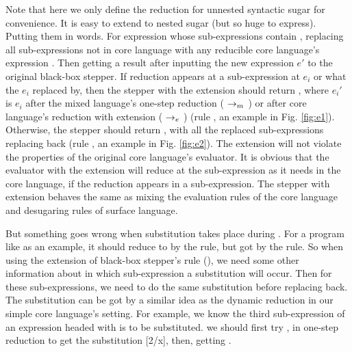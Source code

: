 Note that here we only define the reduction for unnested syntactic sugar for convenience. It is easy to extend to nested sugar (but so huge to express). Putting them in words. For expression  whose sub-expressions contain , replacing all  sub-expressions not in core language with any reducible core language's expression . Then getting a result after inputting the new expression $e'$ to the original black-box stepper. If reduction appears at a sub-expression at $e_i$ or what the $e_i$ replaced by, then the stepper with the extension should return , where $e_i'$ is $e_i$ after the mixed language's one-step reduction ($~\rightarrow_m~$) or after core language's reduction with extension ($~\rightarrow_e~$) (rule , an example in Fig.  \ref{fig:e1}). Otherwise, the stepper should return , with all the replaced sub-expressions replacing back (rule , an example in Fig.  \ref{fig:e2}). The extension will not violate the properties of the original core language's evaluator. It is obvious that the evaluator with the extension will reduce at the sub-expression as it needs in the core language, if the reduction appears in a sub-expression. The stepper with extension behaves the same as mixing the evaluation rules of the core language and desugaring rules of surface language.

But something goes wrong when substitution takes place during . For a program like  as an example, it should reduce to  by the  rule, but got  by the  rule. So when using the extension of black-box stepper's rule (), we need some other information about in which sub-expression a substitution will occur. Then for these sub-expressions, we need to do the same substitution before replacing back. The substitution can be got by a similar idea as the dynamic reduction in our simple core language's setting. For example, we know the third sub-expression of an expression headed with  is to be substituted. we should first try ,  in one-step reduction to get the substitution [2/x], then, getting . 

